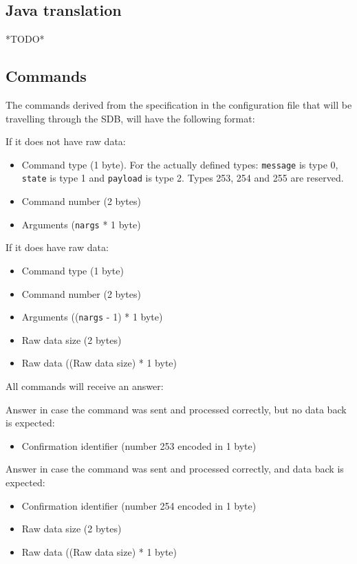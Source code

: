 \documentclass[12pt,a4paper]{report}
\begin{document}
\subsection*{Java translation}
*TODO*

\subsection*{Commands}
The commands derived from the specification in the configuration file that will be travelling through the SDB, will have the following format:

If it does not have raw data:
\begin{itemize}
\item Command type (1 byte). For the actually defined types: \texttt{message} is type 0, \texttt{state} is type 1 and \texttt{payload} is type 2. Types 253, 254 and 255 are reserved.
\item Command number (2 bytes)
\item Arguments (\texttt{nargs} * 1 byte)
\end{itemize}

If it does have raw data:
\begin{itemize}
\item Command type (1 byte)
\item Command number (2 bytes)
\item Arguments ((\texttt{nargs} - 1) * 1 byte)
\item Raw data size (2 bytes)
\item Raw data ((Raw data size) * 1 byte)
\end{itemize}

All commands will receive an answer:

Answer in case the command was sent and processed correctly, but no data back is expected:
\begin{itemize}
\item Confirmation identifier (number 253 encoded in 1 byte)
\end{itemize}

Answer in case the command was sent and processed correctly, and data back is expected:
\begin{itemize}
\item Confirmation identifier (number 254 encoded in 1 byte)
\item Raw data size (2 bytes)
\item Raw data ((Raw data size) * 1 byte)
\end{itemize}
\end{document}
